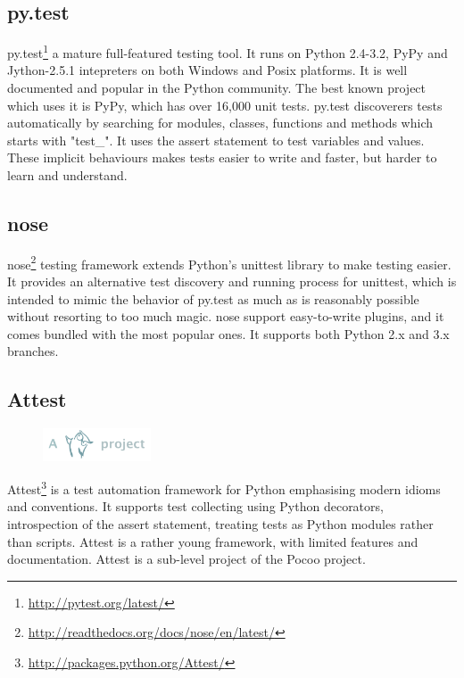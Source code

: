 \subsection{py.test}
py.test\footnote{\url{http://pytest.org/latest/}} a mature full-featured testing
tool. It runs on Python 2.4-3.2, PyPy and Jython-2.5.1 intepreters on both
Windows and Posix platforms. It is well documented and popular in the Python
community. The best known project which uses it is PyPy, which has over 16,000
unit tests. py.test discoverers tests automatically by searching for modules,
classes, functions and methods which starts with "test\_". It uses the assert
statement to test variables and values. These implicit behaviours makes tests
easier to write and faster, but harder to learn and understand.

\subsection{nose}
nose\footnote{\url{http://readthedocs.org/docs/nose/en/latest/}} testing
framework extends Python's unittest library to make testing easier.
It provides an alternative test discovery and running process for unittest,
which is intended to mimic the behavior of py.test as much as is reasonably
possible without resorting to too much magic. nose support easy-to-write
plugins, and it comes bundled with the most popular ones. It supports both
Python 2.x and 3.x branches.

\subsection{Attest}
\label{sec:pre:attest}
\begin{figure}
	\vspace{-20pt}
	\includegraphics[width=3.2cm]{./planning/img/pocoo_logo}
	\vspace{-30pt}
\end{figure}
Attest\footnote{\url{http://packages.python.org/Attest/}} is a test automation
framework for Python emphasising modern idioms and conventions. It supports
test collecting using Python decorators, introspection of the assert statement,
treating tests as Python modules rather than scripts. Attest is a rather young
framework, with limited features and documentation. Attest is a sub-level
project of the Pocoo project.

